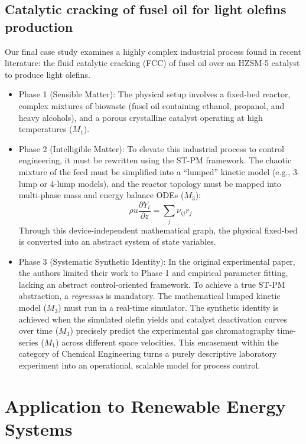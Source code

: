 \documentclass[11pt, a4paper]{article}
\begin{document}
\subsection{Catalytic cracking of fusel oil for light olefins production}
Our final case study examines a highly complex industrial process found in recent literature: the fluid catalytic cracking (FCC) of fusel oil over an HZSM-5 catalyst to produce light olefins.
\begin{itemize}
\item \textrm{Phase 1 (Sensible Matter):} The physical setup involves a fixed-bed reactor, complex mixtures of biowaste (fusel oil containing ethanol, propanol, and heavy alcohols), and a porous crystalline catalyst operating at high temperatures ($M_1$).
\item \textrm{Phase 2 (Intelligible Matter):} To elevate this industrial process to control engineering, it must be rewritten using the ST-PM framework. The chaotic mixture of the feed must be simplified into a ``lumped'' kinetic model (e.g., 3-lump or 4-lump models), and the reactor topology must be mapped into multi-phase mass and energy balance ODEs ($M_3$):
\begin{equation}
\rho u \frac{\partial Y_i}{\partial z} = \sum_{j} \nu_{ij} r_j
\end{equation}
Through this device-independent mathematical graph, the physical fixed-bed is converted into an abstract system of state variables.
\item \textrm{Phase 3 (Systematic Synthetic Identity):} In the original experimental paper, the authors limited their work to Phase 1 and empirical parameter fitting, lacking an abstract control-oriented framework. To achieve a true ST-PM abstraction, a \textit{regressus} is mandatory. The mathematical lumped kinetic model ($M_3$) must run in a real-time simulator. The synthetic identity is achieved when the simulated olefin yields and catalyst deactivation curves over time ($M_3$) precisely predict the experimental gas chromatography time-series ($M_1$) across different space velocities. This encasement within the category of Chemical Engineering turns a purely descriptive laboratory experiment into an operational, scalable model for process control.
\end{itemize}



\section{Application to Renewable Energy Systems}
\end{document}
